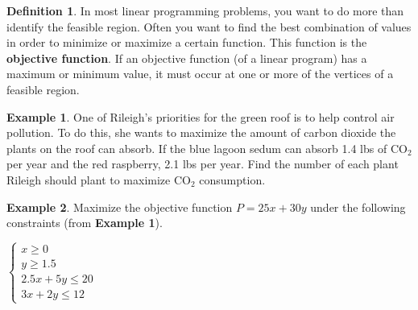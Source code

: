 \documentclass{report}
\theoremstyle{definition}
\newtheorem{example}{\bf Example}
\newtheorem{definition}{\bf Definition}[section]
\begin{document}

\begin{definition} 
In most linear programming problems, you want to do more than identify the feasible region. Often you want to find the best combination of values in order to minimize or maximize a certain function. This function is the \textbf{objective function}. If an objective function (of a linear program) has a maximum or minimum value, it must occur at one or more of the vertices of a feasible region.
\end{definition}




 \newpage



\begin{example}
One of Rileigh's priorities for the green roof is to help control air pollution. To do this, she wants to maximize the amount of carbon dioxide the plants on the roof can absorb. If the blue lagoon sedum can absorb 1.4 lbs of $\text{CO}_2$ per year and the red raspberry, 2.1 lbs per year. Find the number of each plant Rileigh should plant to maximize $\text{CO}_2$ consumption.
\end{example}

\vfill

\begin{example}
Maximize the objective function $P=25x+30y$ under the following constraints (from \textbf{Example 1}).
\end{example}

$
\begin{cases}
x\geq 0\\
y\geq 1.5\\
2.5x+5y\leq20\\
3x+2y\leq12
\end{cases}
$




\vfill
 \noindent{}

 \newpage


\end{document}
